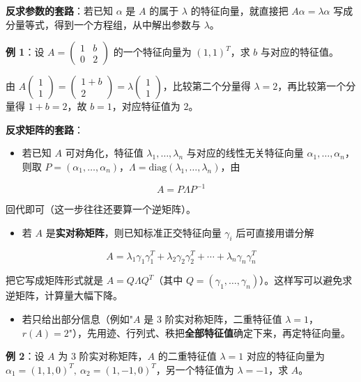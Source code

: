 \documentclass[11pt,openany,UTF8]{ctexbook}
\begin{document}
\textbf{反求参数的套路}：若已知 $\alpha$ 是 $A$ 的属于 $\lambda$ 的特征向量，就直接把 $A\alpha=\lambda\alpha$ 写成分量等式，得到一个方程组，从中解出参数与 $\lambda$。

\textbf{例 1}：设 $A=\begin{pmatrix}1&b\\0&2\end{pmatrix}$ 的一个特征向量为 $(1,1)^T$，求 $b$ 与对应的特征值。

由 $A\begin{pmatrix}1\\1\end{pmatrix}=\begin{pmatrix}1+b\\2\end{pmatrix}=\lambda\begin{pmatrix}1\\1\end{pmatrix}$，比较第二个分量得 $\lambda=2$，再比较第一个分量得 $1+b=2$，故 $b=1$，对应特征值为 $2$。

\textbf{反求矩阵的套路}：

\begin{itemize}
\item 若已知 $A$ 可对角化，特征值 $\lambda_1,\dots,\lambda_n$ 与对应的线性无关特征向量 $\alpha_1,\dots,\alpha_n$，则取 $P=(\alpha_1,\dots,\alpha_n)$，$\Lambda=\mathrm{diag}(\lambda_1,\dots,\lambda_n)$，由
\end{itemize}
\[A=P\Lambda P^{-1}\]

回代即可（这一步往往还要算一个逆矩阵）。

\begin{itemize}
\item 若 $A$ 是\textbf{实对称矩阵}，则已知标准正交特征向量 $\gamma_i$ 后可直接用谱分解
\end{itemize}
\[A=\lambda_1\gamma_1\gamma_1^T+\lambda_2\gamma_2\gamma_2^T+\cdots+\lambda_n\gamma_n\gamma_n^T\]

把它写成矩阵形式就是 $A=Q\Lambda Q^T$（其中 $Q=(\gamma_1,\dots,\gamma_n)$）。这样写可以避免求逆矩阵，计算量大幅下降。

\begin{itemize}
\item 若只给出部分信息（例如"$A$ 是 $3$ 阶实对称矩阵，二重特征值 $\lambda=1$，$r(A)=2$"），先用迹、行列式、秩把\textbf{全部特征值}确定下来，再定特征向量。
\end{itemize}
\textbf{例 2}：设 $A$ 为 $3$ 阶实对称矩阵，$A$ 的二重特征值 $\lambda=1$ 对应的特征向量为 $\alpha_1=(1,1,0)^T,\ \alpha_2=(1,-1,0)^T$，另一个特征值为 $\lambda=-1$，求 $A$。
\end{document}
